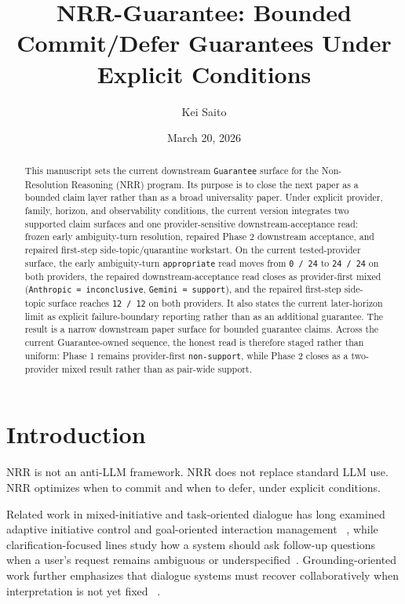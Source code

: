 \documentclass[11pt]{article}
\title{NRR-Guarantee: Bounded Commit/Defer Guarantees Under Explicit Conditions}
\author{Kei Saito}
\date{March 20, 2026}
\begin{document}
\maketitle

\begin{abstract}
This manuscript sets the current downstream \texttt{Guarantee} surface for the
Non-Resolution Reasoning (NRR) program. Its purpose is to close the next paper
as a bounded claim layer rather than as a broad universality paper. Under
explicit provider, family, horizon, and observability conditions, the current
version integrates two supported claim surfaces and one provider-sensitive
downstream-acceptance read: frozen early ambiguity-turn resolution, repaired
Phase 2 downstream acceptance, and repaired first-step side-topic/quarantine
workstart. On the current tested-provider surface, the early ambiguity-turn
\texttt{appropriate} read moves from \texttt{0 / 24} to \texttt{24 / 24} on
both providers, the repaired downstream-acceptance read closes as
provider-first mixed (\texttt{Anthropic = inconclusive},
\texttt{Gemini = support}), and the repaired first-step side-topic surface
reaches \texttt{12 / 12} on both providers. It
also states the current later-horizon limit as explicit failure-boundary
reporting rather than as an additional guarantee. The result is a narrow
downstream paper surface for bounded guarantee claims. Across the current
Guarantee-owned sequence, the honest read is therefore staged rather than
uniform: Phase 1 remains provider-first \texttt{non-support}, while Phase 2
closes as a two-provider mixed result rather than as pair-wide support.
\end{abstract}

\section{Introduction}

NRR is not an anti-LLM framework. NRR does not replace standard LLM use. NRR
optimizes when to commit and when to defer, under explicit conditions.

Related work in mixed-initiative and task-oriented dialogue has long examined
adaptive initiative control and goal-oriented interaction management
~\cite{chucarroll2000mimic,saito2017taskdialogue}, while clarification-focused lines
study how a system should ask follow-up questions when a user's request remains
ambiguous or underspecified~\cite{deboni2003clarification,rao2018evpi,hu2020interactive}. Grounding-oriented work further emphasizes that dialogue systems
must recover collaboratively when interpretation is not yet fixed
~\cite{benotti2021groundedclarifications,benotti2021grounding}.
\end{document}
